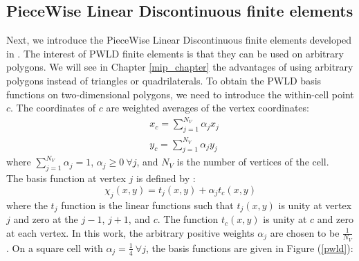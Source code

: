 \subsection{PieceWise Linear Discontinuous finite elements}
Next, we introduce the PieceWise Linear Discontinuous finite
elements developed in \cite{pwld_3d,pwld_2d}. The interest of PWLD finite
elements is that they can be used on arbitrary polygons. We will see in
Chapter \ref{mip_chapter} the advantages of using arbitrary polygons instead
of triangles or quadrilaterals. To obtain the PWLD basis
functions on two-dimensional polygons, we need to introduce the within-cell
point $c$. The coordinates of $c$ are weighted averages of the vertex coordinates:
\begin{align}
& x_c = \sum_{j=1}^{N_V} \alpha_{j} x_j\\
& y_c = \sum_{j=1}^{N_V} \alpha_{j} y_j
\end{align}
where $\sum_{j=1}^{N_V} \alpha_{j}=1$, $\alpha_j \geq 0\ \forall j$, and $N_V$ is 
the number of vertices of the cell.\\
The basis function at vertex $j$ is defined by \cite{pwld_2d}:
\begin{equation}
\chi_{j} (x,y) = t_{j}(x,y) + \alpha_j t_c(x,y)
\end{equation}
where the $t_j$ function is the linear functions such that $t_j (x,y)$ is
unity at vertex $j$ and zero at the  $j-1$, $j+1$, and $c$. The function 
$t_c(x,y)$ is unity at $c$ and zero at each vertex. In this work, the arbitrary 
positive weights $\alpha_j$ are chosen to be $\frac{1}{N_V}$. On a square cell with 
$\alpha_{j}=\frac{1}{4}\ \forall j$, the basis functions are given in Figure 
(\ref{pwld}):

